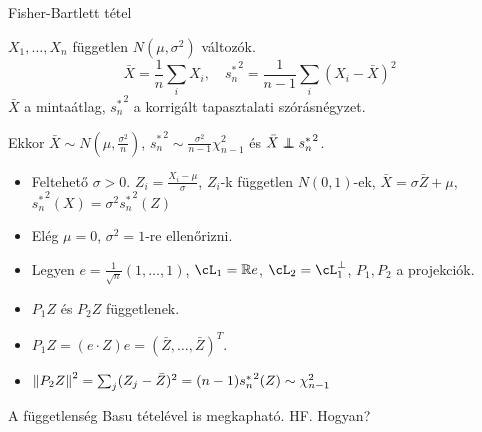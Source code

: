 \documentclass[aspectratio=169,notheorems,9pt,\option]{beamer}
\begin{document}
\begin{frame}{Fisher-Bartlett tétel} 
  \begin{theorem}
    $X_1,\dots,X_n$ független $N (\mu,\sigma^2)$ változók.
    \begin{displaymath}
      \bar{X}=\frac1n\sum_i X_i,\quad {s^*_n}^2=\frac1{n-1}\sum_i (X_i-\bar{X})^2
    \end{displaymath}
    $\bar{X}$ a mintaátlag, ${s^*_n}^2$ a korrigált tapasztalati
    szórásnégyzet.

    Ekkor $\bar{X}\sim N (\mu,\frac{\sigma^2}n)$, $
    {s^*_n}^2\sim\frac{\sigma^2}{n-1}\chi^2_{n-1}$ és
    $\bar{X}\independent {s^*_n}^2$.
  \end{theorem}
  \begin{itemize}
  \item
    Feltehető $\sigma>0$. $Z_i=\frac{X_i-\mu}{\sigma}$, $Z_i$-k
    független $N (0,1)$-ek, $\bar{X}=\sigma\bar{Z}+\mu$,
    ${s^*_n}^2 (X)=\sigma^2{s^*_n}^2 (Z)$

    
  \item Elég $\mu=0$, $\sigma^2=1$-re ellenőrizni.
  
    
  \item Legyen $e= \frac1{\sqrt n}(1,\dots,1)$, $\cL_1=\real e$,
    $\cL_2=\cL_1^\perp$, $P_1,P_2$ a projekciók.
  \item $P_1Z$ és $P_2Z$ függetlenek.
  \item $P_1Z= (e\cdot Z) e = (\bar{Z},\dots,\bar{Z})^T$.
  \item $\norm*{P_2Z}^2=\sum_j (Z_j-\bar{Z})^2= (n-1){s^*_n}^2 (Z)\sim\chi^2_{n-1}$
  \end{itemize}
  \continue
  A függetlenség Basu tételével is megkapható. HF. Hogyan? 
\end{frame} 
\end{document}
